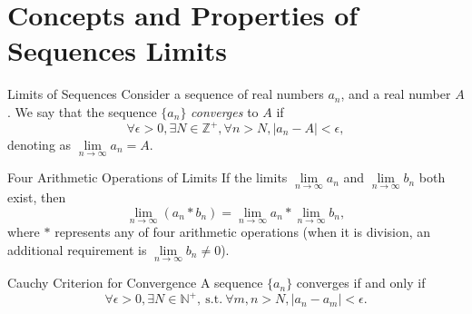 
\section{Concepts and Properties of Sequences Limits}

\begin{definition}{Limits of Sequences}{}
  Consider a sequence of real numbers $a_n$, and a real number $A$.
  We say that the sequence $\{a_n\}$ \emph{converges} to $A$ if
  \begin{equation}
    \forall \epsilon > 0, \exists N \in \mathbb{Z}^+, \forall n > N, |a_n - A| < \epsilon,
  \end{equation}
  denoting as $\lim \limits _{n \rightarrow \infty}a_n = A$.
\end{definition}

\begin{proposition}{Four Arithmetic Operations of Limits}{}
  If the limits $\lim \limits _{n \rightarrow \infty} a_n$ and $\lim \limits _{n \rightarrow \infty} b_n$
  both exist, then
  \begin{equation}
    \lim \limits _{n \rightarrow \infty} (a_n \ast b_n) = \lim \limits _{n \rightarrow \infty} a_n \ast \lim \limits _{n \rightarrow \infty} b_n,
  \end{equation}
  where $\ast$ represents any of four arithmetic operations
  (when it is division, an additional requirement is $\lim \limits _{n
    \rightarrow \infty} b_n \neq 0$).
\end{proposition}

\begin{theorem}{Cauchy Criterion for Convergence}{}
  A sequence $\{a_n\}$ converges if and only if
  \begin{equation}
    \forall \epsilon > 0, \exists N \in \mathbb{N}^+, ~ \mathrm{s.t.}~ \forall m,n > N, |a_n - a_m| < \epsilon.
  \end{equation}
\end{theorem}

\begin{exercise}{}{}
  
\end{exercise}

